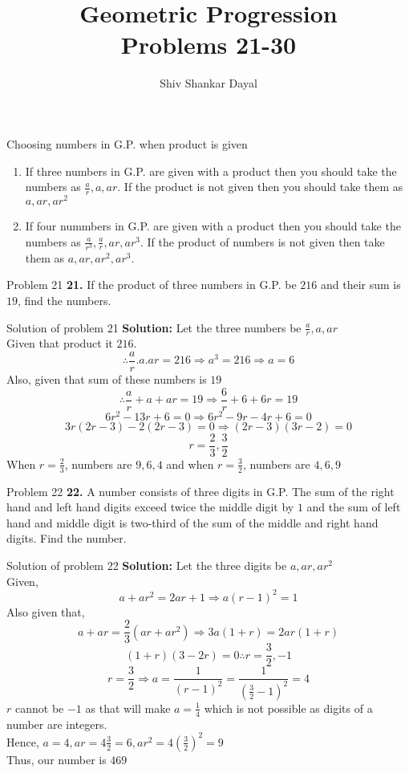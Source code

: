 \documentclass[aspectratio=1610,8pt]{beamer}
\title{Geometric Progression\\Problems 21-30}
\author[Shiv Shankar Dayal]{Shiv Shankar Dayal}
\begin{document}
\begin{frame}
       \titlepage
\end{frame}
\begin{frame}{Choosing numbers in G.P. when product is given}
  \begin{enumerate}
    \item If three numbers in G.P. are given with a product then you should
      take the numbers as $\frac{a}{r}, a, ar$. If the product is not given
      then you should take them as $a, ar, ar^2$
    \item If four nummbers in G.P. are given with a product then you should
      take the numbers as $\frac{a}{r^3}, \frac{a}{r}, ar, ar^3$. If the
      product of numbers is not given then take them as $a, ar, ar^2, ar^3$.
  \end{enumerate}
\end{frame}
\begin{frame}{Problem 21}
  \textbf{21.} If the product of three numbers in G.P. be $216$ and their sum
  is $19$, find the numbers.
\end{frame}
\begin{frame}{Solution of problem 21}
  \textbf{Solution:} Let the three numbers be $\frac{a}{r}, a, ar$\\
  Given that product it $216$.
  $$\therefore \frac{a}{r}.a.ar = 216 \Rightarrow a^3 = 216 \Rightarrow a = 6$$
  Also, given that sum of these numbers is $19$
  $$\therefore \frac{a}{r} + a + ar = 19 \Rightarrow \frac{6}{r} + 6 + 6r =
  19$$
  $$6r^2 - 13r + 6 = 0 \Rightarrow 6r^2 -9r - 4r + 6 = 0$$
  $$3r(2r - 3) - 2(2r -3) = 0 \Rightarrow (2r - 3)(3r -2) = 0$$
  $$r = \frac{2}{3}, \frac{3}{2}$$
  When $r = \frac{2}{3}$, numbers are $9, 6, 4$ and when $r = \frac{3}{2}$,
  numbers are $4, 6, 9$
\end{frame}
\begin{frame}{Problem 22}
  \textbf{22.} A number consists of three digits in G.P. The sum of the right
  hand and left hand digits exceed twice the middle digit by $1$ and the sum of
  left hand and middle digit is two-third of the sum of the middle and right
  hand digits. Find the number.
\end{frame}
\begin{frame}{Solution of problem 22}
  \textbf{Solution:} Let the three digits be $a, ar, ar^2$\\
  Given, $$a + ar^2 = 2ar + 1 \Rightarrow a(r - 1)^2 = 1$$
  Also given that, $$a + ar = \frac{2}{3}(ar + ar^2) \Rightarrow 3a(1 + r) =
  2ar(1 + r)$$
  $$(1 + r)(3 - 2r) = 0 \therefore r = \frac{3}{2}, -1$$
  $$r = \frac{3}{2} \Rightarrow a = \frac{1}{(r - 1)^2} = \frac{1}{(\frac{3}{2} -
    1)^2} = 4$$
  $r$ cannot be $-1$ as that will make $a = \frac{1}{4}$ which is not possible
  as digits of a number are integers.\\
  Hence, $a = 4, ar = 4\frac{3}{2} = 6, ar^2 = 4\left(\frac{3}{2}\right)^2 = 9$\\
  Thus, our number is $469$
\end{frame}
\end{document}
